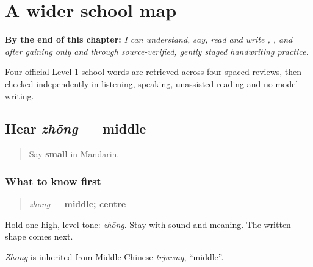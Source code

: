 
\chapter{A wider school map}
\label{ch:zh-school-compounds}

\begin{chapteropening}
\textbf{By the end of this chapter:} \emph{I can understand, say, read and write , ,  and  after gaining only  and  through source-verified, gently staged handwriting practice.}

Four official Level 1 school words are retrieved across four spaced reviews, then checked independently in listening, speaking, unassisted reading and no-model writing.
\end{chapteropening}

\section[zhōng]{Hear \emph{zhōng} — middle}

\label{lesson:ZH-C15-hear-zhong}



\begin{quote}
Say \textbf{small} in Mandarin.
\end{quote}

\subsection*{What to know first}
\begin{quote}
\emph{zhōng} — \textbf{middle; centre}
\end{quote}

Hold one high, level tone: \emph{zhōng}. Stay with sound and meaning. The written shape comes next.

\emph{Zhōng} is inherited from Middle Chinese \emph{trjuwng}, \textquotedblleft{}middle\textquotedblright{}.

